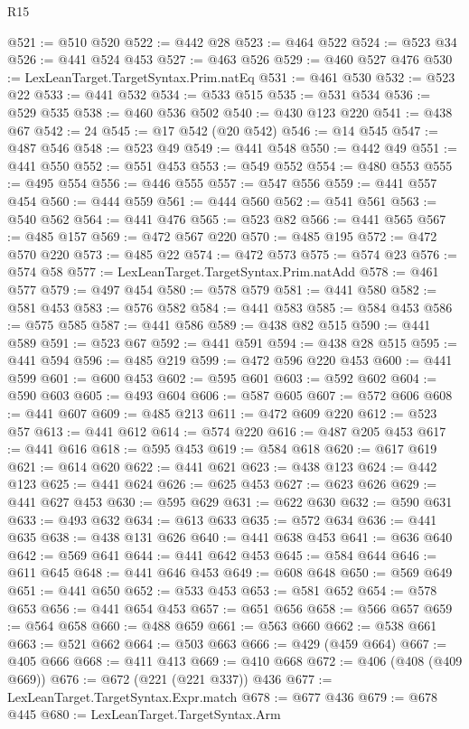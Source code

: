 \begin{lexlean}{R15}
\begin{coremodule}
@521 := @510 @520
@522 := @442 @28
@523 := @464 @522
@524 := @523 @34
@526 := @441 @524 @453
@527 := @463 @526
@529 := @460 @527 @476
@530 := LexLeanTarget.TargetSyntax.Prim.natEq
@531 := @461 @530
@532 := @523 @22
@533 := @441 @532
@534 := @533 @515
@535 := @531 @534
@536 := @529 @535
@538 := @460 @536 @502
@540 := @430 @123 @220
@541 := @438 @67
@542 := 24
@545 := @17 @542 (@20 @542)
@546 := @14 @545
@547 := @487 @546
@548 := @523 @49
@549 := @441 @548
@550 := @442 @49
@551 := @441 @550
@552 := @551 @453
@553 := @549 @552
@554 := @480 @553
@555 := @495 @554
@556 := @446 @555
@557 := @547 @556
@559 := @441 @557 @454
@560 := @444 @559
@561 := @444 @560
@562 := @541 @561
@563 := @540 @562
@564 := @441 @476
@565 := @523 @82
@566 := @441 @565
@567 := @485 @157
@569 := @472 @567 @220
@570 := @485 @195
@572 := @472 @570 @220
@573 := @485 @22
@574 := @472 @573
@575 := @574 @23
@576 := @574 @58
@577 := LexLeanTarget.TargetSyntax.Prim.natAdd
@578 := @461 @577
@579 := @497 @454
@580 := @578 @579
@581 := @441 @580
@582 := @581 @453
@583 := @576 @582
@584 := @441 @583
@585 := @584 @453
@586 := @575 @585
@587 := @441 @586
@589 := @438 @82 @515
@590 := @441 @589
@591 := @523 @67
@592 := @441 @591
@594 := @438 @28 @515
@595 := @441 @594
@596 := @485 @219
@599 := @472 @596 @220 @453
@600 := @441 @599
@601 := @600 @453
@602 := @595 @601
@603 := @592 @602
@604 := @590 @603
@605 := @493 @604
@606 := @587 @605
@607 := @572 @606
@608 := @441 @607
@609 := @485 @213
@611 := @472 @609 @220
@612 := @523 @57
@613 := @441 @612
@614 := @574 @220
@616 := @487 @205 @453
@617 := @441 @616
@618 := @595 @453
@619 := @584 @618
@620 := @617 @619
@621 := @614 @620
@622 := @441 @621
@623 := @438 @123
@624 := @442 @123
@625 := @441 @624
@626 := @625 @453
@627 := @623 @626
@629 := @441 @627 @453
@630 := @595 @629
@631 := @622 @630
@632 := @590 @631
@633 := @493 @632
@634 := @613 @633
@635 := @572 @634
@636 := @441 @635
@638 := @438 @131 @626
@640 := @441 @638 @453
@641 := @636 @640
@642 := @569 @641
@644 := @441 @642 @453
@645 := @584 @644
@646 := @611 @645
@648 := @441 @646 @453
@649 := @608 @648
@650 := @569 @649
@651 := @441 @650
@652 := @533 @453
@653 := @581 @652
@654 := @578 @653
@656 := @441 @654 @453
@657 := @651 @656
@658 := @566 @657
@659 := @564 @658
@660 := @488 @659
@661 := @563 @660
@662 := @538 @661
@663 := @521 @662
@664 := @503 @663
@666 := @429 (@459 @664)
@667 := @405 @666
@668 := @411 @413
@669 := @410 @668
@672 := @406 (@408 (@409 @669))
@676 := @672 (@221 (@221 @337)) @436
@677 := LexLeanTarget.TargetSyntax.Expr.match
@678 := @677 @436
@679 := @678 @445
@680 := LexLeanTarget.TargetSyntax.Arm

\end{coremodule}
\end{lexlean}

